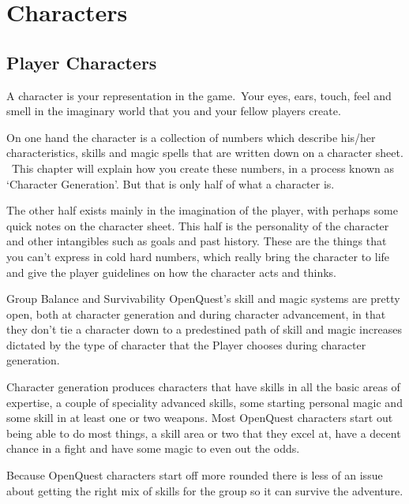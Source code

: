 \chapter{Characters}
\label{ch:characters}

\section{Player Characters}
A character is your representation in the game. Your eyes, ears, touch, feel and smell in the imaginary world that you and your fellow players create.

On one hand the character is a collection of numbers which describe his/her characteristics, skills and magic spells that are written down on a character sheet.  This chapter will explain how you create these numbers, in a process known as `Character Generation'. But that is only half of what a character is.

The other half exists mainly in the imagination of the player, with perhaps some quick notes on the character sheet. This half is the personality of the character and other intangibles such as goals and past history. These are the things that you can’t express in cold hard numbers, which really bring the character to life and give the player guidelines on how the character acts and thinks.

\vspace{3mm}

\begin{rpg-titlebox}{Group Balance and Survivability}
OpenQuest’s skill and magic systems are pretty open, both at character generation and during character advancement, in that they don’t tie a character down to a predestined path of skill and magic increases dictated by the type of character that the Player chooses during character generation.

Character generation produces characters that have skills in all the basic areas of expertise, a couple of speciality advanced skills, some starting personal magic and some skill in at least one or two weapons. Most OpenQuest characters start out being able to do most things, a skill area or two that they excel at, have a decent chance in a fight and have some magic to even out the odds.

Because OpenQuest characters start off more rounded there is less of an issue about getting the right mix of skills for the group so it can survive the adventure.
\end{rpg-titlebox}


